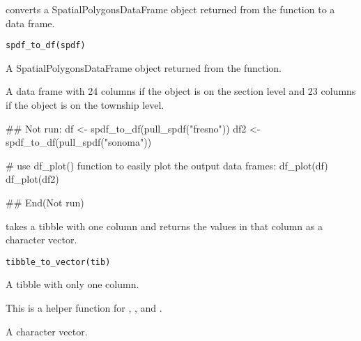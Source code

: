 \documentclass[a4paper]{book}
\begin{document}
%
\begin{Description}\relax
{} converts a SpatialPolygonsDataFrame object returned from
the  function to a data frame.
\end{Description}
%
\begin{Usage}
\begin{verbatim}
spdf_to_df(spdf)
\end{verbatim}
\end{Usage}
%
\begin{Arguments}
\begin{ldescription}
\item[\code{spdf}] A SpatialPolygonsDataFrame object returned from
the  function.
\end{ldescription}
\end{Arguments}
%
\begin{Value}
A data frame with 24 columns if the  object is on the
section level and 23 columns if the  object is on the township
level.
\end{Value}
%
\begin{Examples}
\begin{ExampleCode}
## Not run:
df <- spdf_to_df(pull_spdf("fresno"))
df2 <- spdf_to_df(pull_spdf("sonoma"))

# use df_plot() function to easily plot the output data frames:
df_plot(df)
df_plot(df2)

## End(Not run)
\end{ExampleCode}
\end{Examples}
%
\begin{Description}\relax
{} takes a tibble with one column and returns the
values in that column as a character vector.
\end{Description}
%
\begin{Usage}
\begin{verbatim}
tibble_to_vector(tib)
\end{verbatim}
\end{Usage}
%
\begin{Arguments}
\begin{ldescription}
\item[\code{tib}] A tibble with only one column.
\end{ldescription}
\end{Arguments}
%
\begin{Details}\relax
This is a helper function for , ,
and .
\end{Details}
%
\begin{Value}
A character vector.
\end{Value}
\printindex{}
\end{document}

